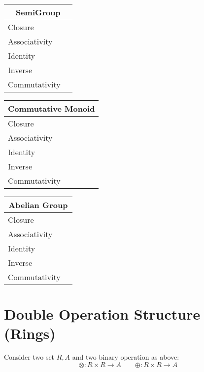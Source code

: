 \documentclass[a4paper,12pt]{scrartcl}    %
\newcommand{\OpA}{\otimes}
\newcommand{\OpB}{\oplus}
\begin{document}
\begin{minipage}[c]{0,5\textwidth}

\begin{tabular}{|l|p{2cm}|} %
  \hline
  \multicolumn{2}{c}{\cellcolor{yellow!25}SemiGroup} \\
  \hline
   \cellcolor{blue!25} Closure&  \\
    \cellcolor{blue!25} Associativity&  \\
    \cellcolor{red!25} Identity&  \\
    \cellcolor{red!25} Inverse&  \\
    \cellcolor{red!25} Commutativity&  \\
  \hline
\end{tabular}

\vspace{0.6cm}
\begin{tabular}{|l|p{2cm}|} %
  \hline
  \multicolumn{2}{c}{\cellcolor{yellow!25}Commutative Monoid} \\
  \hline
   \cellcolor{blue!25} Closure&  \\
    \cellcolor{blue!25} Associativity&  \\
    \cellcolor{blue!25} Identity&  \\
    \cellcolor{red!25} Inverse&  \\
    \cellcolor{blue!25} Commutativity&  \\
  \hline
\end{tabular}

\vspace{0.6cm}
\begin{tabular}{|l|p{2cm}|} %
  \hline
  \multicolumn{2}{c}{\cellcolor{yellow!25}Abelian Group} \\
  \hline
   \cellcolor{blue!25} Closure&  \\
    \cellcolor{blue!25} Associativity&  \\
    \cellcolor{blue!25} Identity&  \\
    \cellcolor{blue!25} Inverse&  \\
    \cellcolor{blue!25} Commutativity&  \\
  \hline
\end{tabular}

\end{minipage}

\newpage
\section{Double Operation Structure (Rings)}
Consider two set $R, A$ and two binary operation as above:
\begin{displaymath}
		\OpA : R \times R \rightarrow A \qquad 	\OpB : R \times R \rightarrow A
\end{displaymath}
\end{document}
